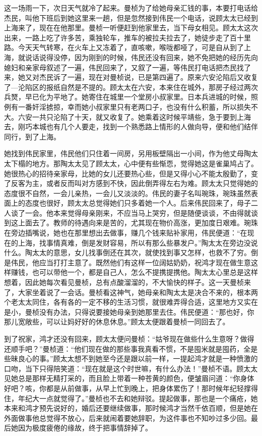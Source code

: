 \par 这一场雨一下，次日天气就冷了起来。曼桢为了给她母亲汇钱的事，本要打电话给杰民，叫他下班后到她这里来一趟，但是忽然接到伟民一个电话，说顾太太已经到上海来了，现在在他那里。曼桢一听便赶到他家里去，当下母女相见。顾太太这次出来，一路上吃了许多苦，乘独轮车，推车的被拉夫拉去了，她徒步走了百十里路。今天天气转寒，在火车上又冻着了，直咳嗽，喉咙都哑了，可是自从到了上海，就说话说得没停，因为刚到的时候，伟民还没有回来，她不免把她的经历先向媳妇和亲家母叙述了一遍，伟民回来了，又叙了一遍，等伟民打电话把杰民找了来，她又对杰民诉了一遍，现在对曼桢说，已是第四遍了。原来六安沦陷后又收复了—沦陷区的报纸自然是不提的。顾太太在六安，本来住在城外，那房子经过两次兵燹，早已化为平地了。她寄住在城里一个堂房小叔家里。日本兵进城的时候，照例有一番奸淫掳掠，幸而她小叔家里只有老两口子，也没有什么积蓄，所以损失不大。六安一共只沦陷了十天，就又收复了。她乘着这时候平靖些，急于要到上海去，刚巧本城也有几个人要走，找到一个熟悉路上情形的人做向导，便和他们结伴同行，到了上海。
\par 她找到伟民家里，伟民他们只住着一间房，另用板壁隔出一小间，作为他丈母陶太太下榻的地方。那陶太太见了顾太太，心中便有些惭恧，觉得她这是雀巢鸠占了。她很热心的招待亲家母，比她的女儿还要热心些，但是又得小心不能太殷勤了，变了反客为主，或者反而叫对方感到不快，因此倒弄得左右为难。顾太太只觉得她的态度很不自然，一会儿亲热，一会儿又淡淡的。伟民的妻子名叫琬珠，琬珠虽然表面上的态度也很好，顾太太总觉得她们只多着她一个人。后来伟民回来了，母子二人谈了一会。他本来觉得母亲刚来，不应当马上哭穷，但是随便谈谈，不由得就谈到这上面去了。教师的待遇向来是苦的，尤其现在物价高涨，更加度日艰难。琬珠在旁边插嘴说，她也在那里想出去做事，赚几个钱来贴补家用，伟民便道：“在现在的上海，找事情真难，倒是发财容易，所以有那么些暴发户。”陶太太在旁边没说什么。陶太太的意思，女儿找事倒还在其次，就使找到事又怎样，也救不了穷。倒是伟民，他应当打打主意了。既然他们有这样一位阔姑奶奶，祝鸿才现在做生意这样赚钱，也可以带他一个，都是自己人，怎么不提携提携他。陶太太心里总是这样想着，因此她每次看见曼桢，总有点酸溜溜的，不大愉快的样子。这一天曼桢来了，大家坐着说了一会话。曼桢看这神气，她母亲和陶太太是决合不来的，根本两个老太太同住，各有各的一定不移的生活习惯，就很难弄得合适，这里地方又实在是小，曼桢没有办法，只得说要接她母亲到她那里去住。伟民便道：“那也好，你那儿宽敞些，可以让妈好好的休息休息。”顾太太便跟着曼桢一同回去了。
\par 到了祝家，鸿才还没有回来，顾太太便问曼桢：“姑爷现在做些什么生意呀？做得还顺手吧？”曼桢道：“他们现在做的那些事我真看不惯，不是囤米就是囤药，全是些昧良心的事。”顾太太想不到她至今还是跟以前一样，一提起鸿才就是一种愤激的口吻，当下只得陪笑道：“现在就是这个时世嘛，有什么办法！”曼桢不语。顾太太见她总是那样无精打采的，而且脸上带着一种苍黄的颜色，便皱眉问道：“你身体好吧？咳，你都是从前做事，从早上忙到晚上，把身体累伤了！那时候年纪轻撑得住，年纪大一点就觉得了。”曼桢也不去和她辩驳。提起做事，那也是一个痛疮，她本来和鸿才预先说好的，婚后还要继续做事，那时候鸿才当然千依百顺，但是她在外面做事他总觉得不放心，后来就闹着要她辞职，为这件事也不知吵过多少回。最后她因为极度疲倦的缘故，终于把事情辞掉了。
